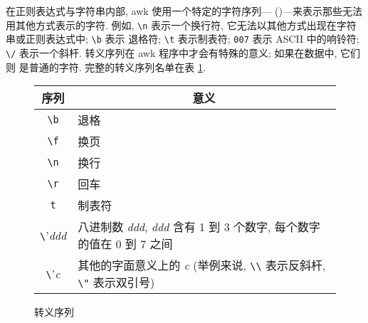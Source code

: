 在正则表达式与字符串内部, awk 使用一个特定的字符序列---{}
(){}---来表示那些无法用其他方式表示的字符. 例如,
\verb'\n'
表示一个换行符, 它无法以其他方式出现在字符串或正则表达式中; \verb'\b' 表示
退格符; \verb'\t' 表示制表符; \verb'007' 表示 ASCII 中的响铃符; \verb'\/'
表示一个斜杆. 转义序列在 awk 程序中才会有特殊的意义; 如果在数据中, 它们则
是普通的字符. 完整的转义序列名单在表 \ref{tbl:escape_sequences}.
\begin{figure}[ht]
\captionsetup{type=table}
\caption{转义序列}
\label{tbl:escape_sequences}
\begin{center}
\begin{tabular}{c|l}
    \hline
    \hline
    序列        &  \multicolumn{1}{c}{意义}  \\
    \hline
    \verb'\b'   & 退格  \\
    \verb'\f'   & 换页  \\
    \verb'\n'   & 换行 \\
    \verb'\r'   & 回车 \\
    \verb't'    & 制表符    \\
    \verb'\'\textit{ddd} & 八进制数 \textit{ddd}, \textit{ddd}
        含有 1 到 3 个数字, 每个数字的值在 0 到 7 之间 \\
    \verb'\'\textit{c} & 其他的字面意义上的 \textit{c}
        (举例来说, \verb'\\' 表示反斜杆, \verb'\"' 表示双引号) \\
    \hline
\end{tabular}
\end{center}
\end{figure}


